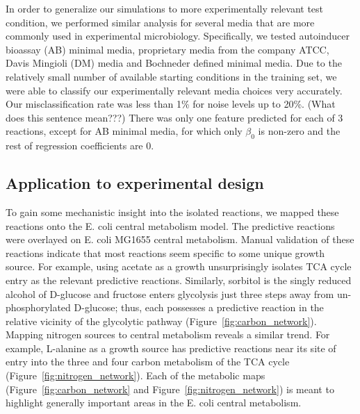 \documentclass[12pt]{article}
\begin{document}
In order to generalize our simulations to more experimentally relevant test condition, we performed similar analysis for several media that are more commonly used in experimental microbiology. Specifically, we tested autoinducer bioassay (AB) minimal media, proprietary media from the company ATCC, Davis Mingioli (DM) media and Bochneder defined minimal media. Due to the relatively small number of available starting conditions in the training set, we were able to classify our experimentally relevant media choices very accurately. Our misclassification rate was less than 1\% for noise levels up to 20\%. (What does this sentence mean???) There was only one feature predicted for each of 3 reactions, except for AB minimal media, for which only $\beta_0$ is non-zero and the rest of regression coefficients are 0.


\subsection*{Application to experimental design}

To gain some mechanistic insight into the isolated reactions, we mapped these reactions onto the E. coli central metabolism model. The predictive reactions were overlayed on E. coli MG1655 central metabolism. Manual validation of these reactions indicate that most reactions seem specific to some unique growth source. For example, using acetate as a growth unsurprisingly isolates TCA cycle entry as the relevant predictive reactions. Similarly, sorbitol is the singly reduced alcohol of D-glucose and fructose enters glycolysis just three steps away from un-phosphorylated D-glucose; thus, each possesses a predictive reaction in the relative vicinity of the glycolytic pathway (Figure~\ref{fig:carbon_network}). Mapping nitrogen sources to central metabolism reveals a similar trend. For example, L-alanine as a growth source has predictive reactions near its site of entry into the three and four carbon metabolism of the TCA cycle (Figure~\ref{fig:nitrogen_network}). Each of the metabolic maps (Figure~\ref{fig:carbon_network} and Figure~\ref{fig:nitrogen_network}) is meant to highlight generally important areas in the E. coli central metabolism.
\end{document}

